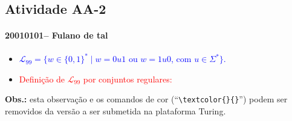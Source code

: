 \documentclass[12pt]{article}
\def\discente{Fulano de tal}
\def\matricula{20010101}
\def\aa{2}
\def\myling{{99}} %
\newcommand{\concatL}{\ensuremath{{\scriptstyle\circ}}}
\begin{document}
\subsection*{Atividade AA-\aa}
 \paragraph{\matricula -- \discente}
%
 \begin{itemize}
  \item \textcolor{blue}{$\mathcal{L}_\myling = \{w\in\{0,1\}^*\mid w=0u1$ ou $w=1u0$, com $u\in\Sigma^*\}$.}
%
  \item  \textcolor{red}{Definição de $\mathcal{L}_\myling$ por conjuntos regulares:
%
  }
% 
 \end{itemize}
%
\noindent\textbf{Obs.:} esta observação e os comandos de cor (``\verb|\textcolor{}{}|'') podem ser removidos da versão a ser submetida na plataforma Turing.
\end{document}
